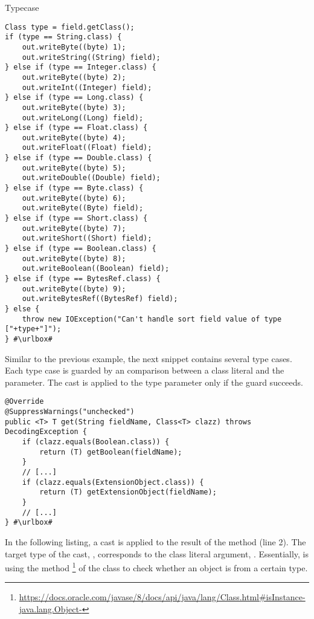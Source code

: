 \begin{pattern}{Typecase}
\def\urlvar{http://bit.ly/elastic_elasticsearch_2SSgsFV}
\begin{verbatim}
Class type = field.getClass();
if (type == String.class) {
    out.writeByte((byte) 1);
    out.writeString((String) field);
} else if (type == Integer.class) {
    out.writeByte((byte) 2);
    out.writeInt((Integer) field);
} else if (type == Long.class) {
    out.writeByte((byte) 3);
    out.writeLong((Long) field);
} else if (type == Float.class) {
    out.writeByte((byte) 4);
    out.writeFloat((Float) field);
} else if (type == Double.class) {
    out.writeByte((byte) 5);
    out.writeDouble((Double) field);
} else if (type == Byte.class) {
    out.writeByte((byte) 6);
    out.writeByte((Byte) field);
} else if (type == Short.class) {
    out.writeByte((byte) 7);
    out.writeShort((Short) field);
} else if (type == Boolean.class) {
    out.writeByte((byte) 8);
    out.writeBoolean((Boolean) field);
} else if (type == BytesRef.class) {
    out.writeByte((byte) 9);
    out.writeBytesRef((BytesRef) field);
} else {
    throw new IOException("Can't handle sort field value of type ["+type+"]");
} #\urlbox#
\end{verbatim}

Similar to the previous example, the next snippet contains several type cases.
Each type case is guarded by an  comparison between a class literal and the  parameter.
The cast is applied to the type parameter  only if the guard succeeds.

\def\urlvar{http://bit.ly/OPCFoundation_UA_Java_Legacy_2Fb2xmZ}
\begin{verbatim}
@Override
@SuppressWarnings("unchecked")
public <T> T get(String fieldName, Class<T> clazz) throws DecodingException {
    if (clazz.equals(Boolean.class)) {
        return (T) getBoolean(fieldName);
    }
    // [...]
    if (clazz.equals(ExtensionObject.class)) {
        return (T) getExtensionObject(fieldName);
    }
    // [...]
} #\urlbox#
\end{verbatim}

In the following listing,
a cast is applied to the result of the  method (line 2).
The target type of the cast, , corresponds to the class literal argument, .
Essentially,  is using the  method%
\footnote{\url{https://docs.oracle.com/javase/8/docs/api/java/lang/Class.html\#isInstance-java.lang.Object-}}
of the class  to check whether an object is from a certain type.


\end{pattern}
